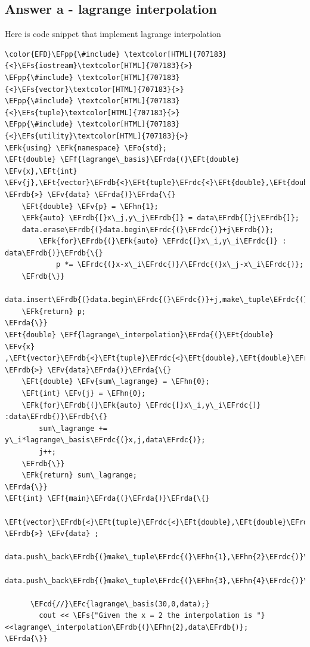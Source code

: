 \documentclass[11pt]{article}
\newcommand{\EFc}[1]{\textcolor{EFc}{#1}} %
\newcommand{\EFcd}[1]{\textcolor{EFcd}{#1}} %
\newcommand{\EFs}[1]{\textcolor{EFs}{#1}} %
\newcommand{\EFk}[1]{\textcolor{EFk}{#1}} %
\newcommand{\EFf}[1]{\textcolor{EFf}{#1}} %
\newcommand{\EFv}[1]{\textcolor{EFv}{#1}} %
\newcommand{\EFt}[1]{\textcolor{EFt}{#1}} %
\newcommand{\EFo}[1]{\textcolor{EFo}{#1}} %
\newcommand{\EFpp}[1]{\textcolor{EFpp}{#1}} %
\newcommand{\EFhn}[1]{\textcolor{EFhn}{#1}} %
\newcommand{\EFrda}[1]{\textcolor{EFrda}{#1}} %
\newcommand{\EFrdb}[1]{\textcolor{EFrdb}{#1}} %
\newcommand{\EFrdc}[1]{\textcolor{EFrdc}{#1}} %
\begin{document}
\subsection{Answer a - lagrange interpolation}
\label{sec:org530242f}
Here is code snippet that implement lagrange interpolation
\begin{Code}
\begin{Verbatim}
\color{EFD}\EFpp{\#include} \textcolor[HTML]{707183}{<}\EFs{iostream}\textcolor[HTML]{707183}{>}
\EFpp{\#include} \textcolor[HTML]{707183}{<}\EFs{vector}\textcolor[HTML]{707183}{>}
\EFpp{\#include} \textcolor[HTML]{707183}{<}\EFs{tuple}\textcolor[HTML]{707183}{>}
\EFpp{\#include} \textcolor[HTML]{707183}{<}\EFs{utility}\textcolor[HTML]{707183}{>}
\EFk{using} \EFk{namespace} \EFo{std};
\EFt{double} \EFf{lagrange\_basis}\EFrda{(}\EFt{double} \EFv{x},\EFt{int} \EFv{j},\EFt{vector}\EFrdb{<}\EFt{tuple}\EFrdc{<}\EFt{double},\EFt{double}\EFrdc{>}    \EFrdb{>} \EFv{data} \EFrda{)}\EFrda{\{}
    \EFt{double} \EFv{p} = \EFhn{1};
    \EFk{auto} \EFrdb{[}x\_j,y\_j\EFrdb{]} = data\EFrdb{[}j\EFrdb{]};
    data.erase\EFrdb{(}data.begin\EFrdc{(}\EFrdc{)}+j\EFrdb{)};
        \EFk{for}\EFrdb{(}\EFk{auto} \EFrdc{[}x\_i,y\_i\EFrdc{]} : data\EFrdb{)}\EFrdb{\{}
            p *= \EFrdc{(}x-x\_i\EFrdc{)}/\EFrdc{(}x\_j-x\_i\EFrdc{)};
    \EFrdb{\}}
    data.insert\EFrdb{(}data.begin\EFrdc{(}\EFrdc{)}+j,make\_tuple\EFrdc{(}x\_j,y\_j\EFrdc{)}\EFrdb{)};
    \EFk{return} p;
\EFrda{\}}
\EFt{double} \EFf{lagrange\_interpolation}\EFrda{(}\EFt{double} \EFv{x} ,\EFt{vector}\EFrdb{<}\EFt{tuple}\EFrdc{<}\EFt{double},\EFt{double}\EFrdc{>}    \EFrdb{>} \EFv{data}\EFrda{)}\EFrda{\{}
    \EFt{double} \EFv{sum\_lagrange} = \EFhn{0};
    \EFt{int} \EFv{j} = \EFhn{0};
    \EFk{for}\EFrdb{(}\EFk{auto} \EFrdc{[}x\_i,y\_i\EFrdc{]} :data\EFrdb{)}\EFrdb{\{}
        sum\_lagrange += y\_i*lagrange\_basis\EFrdc{(}x,j,data\EFrdc{)};
        j++;
    \EFrdb{\}}
    \EFk{return} sum\_lagrange;
\EFrda{\}}
\EFt{int} \EFf{main}\EFrda{(}\EFrda{)}\EFrda{\{}
    \EFt{vector}\EFrdb{<}\EFt{tuple}\EFrdc{<}\EFt{double},\EFt{double}\EFrdc{>}    \EFrdb{>} \EFv{data} ;
    data.push\_back\EFrdb{(}make\_tuple\EFrdc{(}\EFhn{1},\EFhn{2}\EFrdc{)}\EFrdb{)};
    data.push\_back\EFrdb{(}make\_tuple\EFrdc{(}\EFhn{3},\EFhn{4}\EFrdc{)}\EFrdb{)};

      \EFcd{//}\EFc{lagrange\_basis(30,0,data);}
        cout << \EFs{"Given the x = 2 the interpolation is "} <<lagrange\_interpolation\EFrdb{(}\EFhn{2},data\EFrdb{)};
\EFrda{\}}
\end{Verbatim}
\end{Code}
\end{document}
